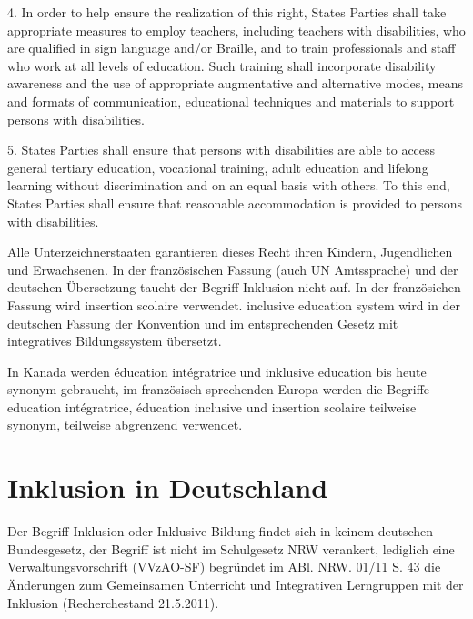 {4. In order to help ensure the realization of this right, States Parties shall take appropriate measures to employ teachers, including teachers with disabilities, who are qualified in sign language and/or Braille, and to train professionals and staff who work at all levels of education. Such training shall incorporate disability awareness and the use of appropriate augmentative and alternative modes, means and formats of communication, educational techniques and materials to support persons with disabilities. 

5. States Parties shall ensure that persons with disabilities are able to access general tertiary education, vocational training, adult education and lifelong learning without discrimination and on an equal basis with others. To this end, States Parties shall ensure that reasonable accommodation is provided to persons with disabilities. }

Alle Unterzeichnerstaaten garantieren dieses Recht ihren Kindern, Jugendlichen und Erwachsenen. In der französischen Fassung (auch UN Amtssprache) und der deutschen Übersetzung taucht der Begriff Inklusion nicht auf. In der französichen Fassung wird insertion scolaire ver­wendet. inclusive education system wird in der deutschen Fassung der Konvention und im ent­sprechenden Gesetz \cite{BGBe:08} mit integratives Bildungssystem übersetzt.

In Kanada werden éducation intégratrice und inklusive education bis heute synonym ge­braucht, im französisch sprechenden Europa werden die Begriffe education intégratrice, éducation inclusive und insertion scolaire teilweise synonym, teilweise abgrenzend verwendet.
\section{Inklusion in Deutschland}
Der Begriff Inklusion oder Inklusive Bildung findet sich in keinem deutschen Bundesgesetz, der Begriff ist nicht im Schulgesetz NRW verankert, lediglich eine Verwaltungsvorschrift 
(VVzAO-SF) begründet im ABl. NRW. 01/11 S. 43 die Änderungen zum Gemeinsamen Un­terricht und Integrativen Lerngruppen mit der Inklusion 
(Recherchestand 21.5.2011). 
